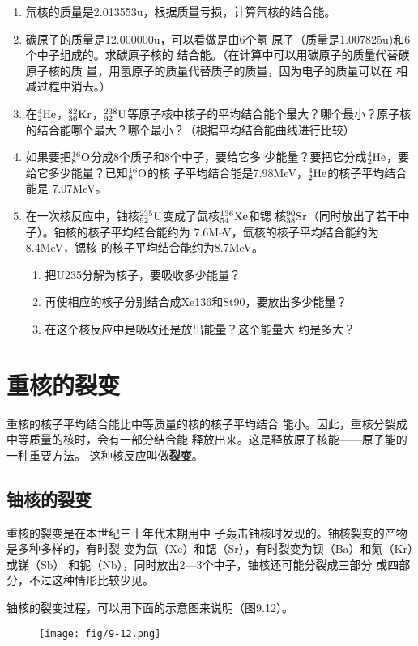 \begin{enumerate}
    \item 氘核的质量是2.013553u，根据质量亏损，计算氘核的结合能。
    \item 碳原子的质量是12.000000u，可以看做是由6个氢
原子（质量是1.007825u)和6个中子组成的。求碳原子核的
结合能。（在计算中可以用碳原子的质量代替碳原子核的质
量，用氢原子的质量代替质子的质量，因为电子的质量可以在
相减过程中消去。）
\item  在$\atom{He}{4}{2}$，$\atom{Kr}{82}{36}$，$\atom{U}{238}{92}$等原子核中核子的平均结合能个最大？哪个最小？原子核的结合能哪个最大？哪个最小？（根据平均结合能曲线进行比较）
\item 如果要把$\atom{O}{16}{8}$分成8个质子和8个中子，要给它多
少能量？要把它分成$\atom{He}{4}{2}$，要给它多少能量？已知$\atom{O}{16}{8}$的核
子平均结合能是7.98MeV，$\atom{He}{4}{2}$的核子平均结合能是
7.07MeV。
\item 在一次核反应中，铀核$\atom{U}{235}{92}$变成了氙核$\atom{Xe}{136}{54}$和锶
核$\atom{Sr}{90}{38}$（同时放出了若干中子）。铀核的核子平均结合能约为
7.6MeV，氙核的核子平均结合能约为8.4MeV，锶核
的核子平均结合能约为8.7MeV。
\begin{enumerate}
    \item 把U235分解为核子，要吸收多少能量？
    \item 再使相应的核子分别结合成Xe136和St90，要放出多少能量？
    \item 在这个核反应中是吸收还是放出能量？这个能量大
约是多大？
\end{enumerate}
\end{enumerate}


\section{重核的裂变}
重核的核子平均结合能比中等质量的核的核子平均结合
能小。因此，重核分裂成中等质量的核时，会有一部分结合能
释放出来。这是释放原子核能——原子能的一种重要方法。
这种核反应叫做\textbf{裂变}。

\subsection{铀核的裂变}

重核的裂变是在本世纪三十年代末期用中
子轰击铀核时发现的。铀核裂变的产物是多种多样的，有时裂
变为氙（Xe）和锶（Sr），有时裂变为钡（Ba）和氮（Kr）或锑（Sb）
和铌（Nb），同时放出2—3个中子，铀核还可能分裂成三部分
或四部分，不过这种情形比较少见。

铀核的裂变过程，可以用下面的示意图来说明（图9.12）。
\begin{figure}[htp]\centering
\texttt{[image: fig/9-12.png]}
\caption{}
\end{figure}

